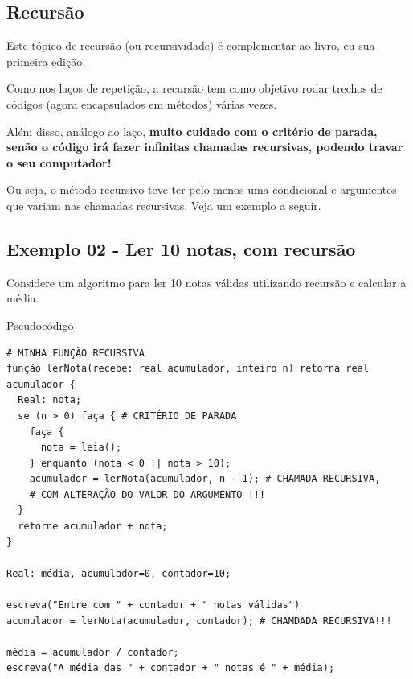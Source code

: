 \documentclass[12pt,a4paper]{article}
\begin{document}
    \hypertarget{recursuxe3o}{%
\subsection{Recursão}\label{recursuxe3o}}

    Este tópico de recursão (ou recursividade) é complementar ao livro, eu
sua primeira edição.

Como nos laços de repetição, a recursão tem como objetivo rodar trechos
de códigos (agora encapsulados em métodos) várias vezes.

Além disso, análogo ao laço, \textbf{muito cuidado com o critério de
parada, senão o código irá fazer infinitas chamadas recursivas, podendo
travar o seu computador!}

Ou seja, o método recursivo teve ter pelo menos uma condicional e
argumentos que variam nas chamadas recursivas. Veja um exemplo a seguir.

    \hypertarget{exemplo-02---ler-10-notas-com-recursuxe3o}{%
\subsection{Exemplo 02 - Ler 10 notas, com
recursão}\label{exemplo-02---ler-10-notas-com-recursuxe3o}}

Considere um algoritmo para ler 10 notas válidas utilizando recursão e
calcular a média.

    Pseudocódigo

\begin{verbatim}
# MINHA FUNÇÃO RECURSIVA
função lerNota(recebe: real acumulador, inteiro n) retorna real acumulador {
  Real: nota;
  se (n > 0) faça { # CRITÉRIO DE PARADA
    faça {
      nota = leia();
    } enquanto (nota < 0 || nota > 10); 
    acumulador = lerNota(acumulador, n - 1); # CHAMADA RECURSIVA, 
    # COM ALTERAÇÃO DO VALOR DO ARGUMENTO !!!
  }
  retorne acumulador + nota;
}

Real: média, acumulador=0, contador=10;

escreva("Entre com " + contador + " notas válidas")
acumulador = lerNota(acumulador, contador); # CHAMDADA RECURSIVA!!!

média = acumulador / contador;
escreva("A média das " + contador + " notas é " + média);
\end{verbatim}
\end{document}
